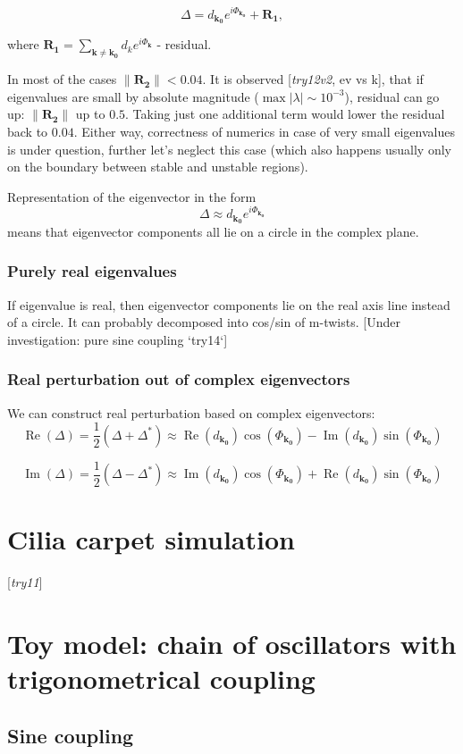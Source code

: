 \documentclass[a4paper,12pt]{article}
\newcommand{\D}{\Delta}%
\begin{document}
$$
\D = d_{\mathbf{k_0}} e^{i \Phi_\mathbf{k_0}}  + \mathbf{R_1},
$$

where $\mathbf{R_1} = \sum_{\mathbf{\mathbf{k} \neq \mathbf{k_0}}} d_k e^{i \Phi_\mathbf{k}}$ - residual.

In most of the cases $\lVert \mathbf{R_2} \rVert < 0.04$. It is observed [\textit{try12v2}, ev vs k], that if eigenvalues are small by absolute magnitude ($\max|\lambda| \sim  10^{-3}$), residual can go up: $\lVert \mathbf{R_2} \rVert$ up to $0.5$. Taking just one additional term would lower the residual back to $0.04$. Either way, correctness of numerics in case of very small eigenvalues is under question, further let's neglect this case (which also happens usually only on the boundary between stable and unstable regions).

Representation of the eigenvector in the form
$$
\D \approx d_{\mathbf{k_0}} e^{i \Phi_\mathbf{k_0}}
$$
means that eigenvector components all lie on a circle in the complex plane.

\subsubsection*{Purely real eigenvalues}

If eigenvalue is real, then eigenvector components lie on the real axis line instead of a circle. It can probably decomposed into cos/sin of m-twists. [Under investigation: pure sine coupling `try14`]

\subsubsection*{Real perturbation out of complex eigenvectors}

We can construct real perturbation based on complex eigenvectors:
$$
\operatorname{Re}(\D)
= \frac{1}{2} ( \D + \D^*) 
\approx  \operatorname{Re}(d_{\mathbf{k_0}}) \cos(\Phi_{\mathbf{k_0}}) - \operatorname{Im}(d_{\mathbf{k_0}}) \sin(\Phi_{\mathbf{k_0}})
$$

$$
\operatorname{Im}(\D)
= \frac{1}{2} ( \D - \D^*)
\approx  \operatorname{Im}(d_{\mathbf{k_0}}) \cos(\Phi_{\mathbf{k_0}}) + \operatorname{Re}(d_{\mathbf{k_0}}) \sin(\Phi_{\mathbf{k_0}})
$$

\section*{Cilia carpet simulation}
[\textit{try11}]


\section*{Toy model: chain of oscillators with trigonometrical coupling}



\subsection*{Sine coupling}
\end{document}
